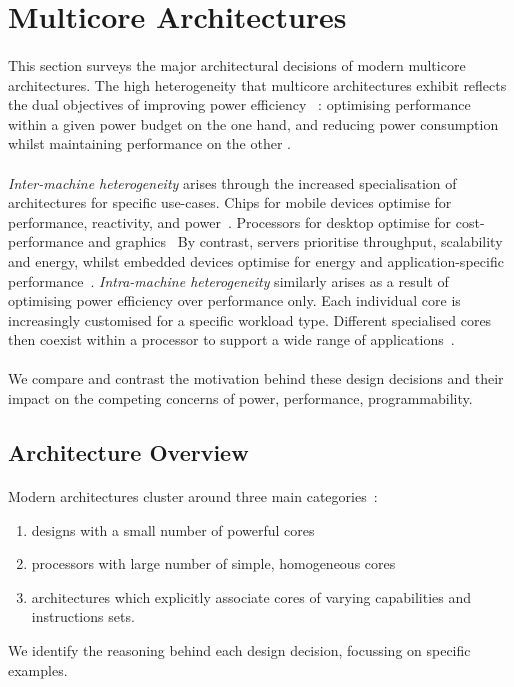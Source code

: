 
\section{Multicore Architectures}
\paragraph{}  This section surveys the major architectural decisions of modern multicore 
architectures. The high heterogeneity that multicore architectures exhibit
reflects the dual objectives of improving power efficiency ~\cite{borkar2011future}:
optimising performance within a given power budget on the one hand, 
and reducing power consumption whilst maintaining performance on the other .



\paragraph{} \emph{Inter-machine heterogeneity} arises through the
increased specialisation of architectures for specific use-cases. Chips for
mobile devices optimise for performance, reactivity, and power~\cite{hennessy2006comparchquantitative}.
Processors for desktop optimise for cost-performance and graphics~\cite{hennessy2006comparchquantitative}
By contrast, servers prioritise throughput, scalability and energy,
whilst embedded devices optimise for energy and application-specific
performance~\cite{hennessy2006comparchquantitative}. \emph {Intra-machine heterogeneity}  similarly arises as a result of optimising power efficiency over 
performance only. Each individual core is increasingly customised
for a specific workload type. Different specialised cores then coexist within
a processor to support a wide range of applications~\cite{5695539,balakrishnan2005impactperfasym}. 

\paragraph{} We compare and contrast the motivation behind these
design decisions and their impact on the competing
concerns of power, performance, programmability.

\subsection{Architecture Overview}

\paragraph{} Modern architectures cluster around three main categories~\cite{Vajda:1414193}: \begin{enumerate}
\item designs with a small number of powerful cores 
\item  processors with large number of simple, homogeneous cores 
\item architectures which explicitly associate cores of varying capabilities and instructions sets.
\end{enumerate} We identify the
reasoning behind each design decision, focussing on specific examples.


